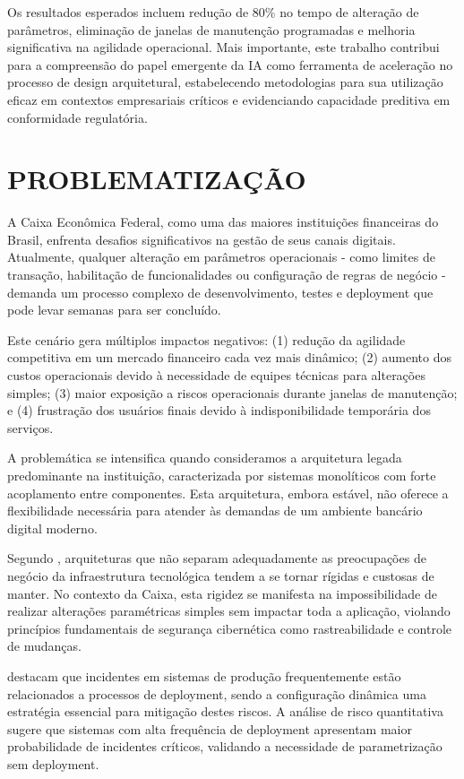 Os resultados esperados incluem redução de 80\% no tempo de alteração de parâmetros, eliminação de janelas de manutenção programadas e melhoria significativa na agilidade operacional. Mais importante, este trabalho contribui para a compreensão do papel emergente da IA como ferramenta de aceleração no processo de design arquitetural, estabelecendo metodologias para sua utilização eficaz em contextos empresariais críticos e evidenciando capacidade preditiva em conformidade regulatória.

\chapter{PROBLEMATIZAÇÃO}

A Caixa Econômica Federal, como uma das maiores instituições financeiras do Brasil, enfrenta desafios significativos na gestão de seus canais digitais. Atualmente, qualquer alteração em parâmetros operacionais - como limites de transação, habilitação de funcionalidades ou configuração de regras de negócio - demanda um processo complexo de desenvolvimento, testes e deployment que pode levar semanas para ser concluído.

Este cenário gera múltiplos impactos negativos: (1) redução da agilidade competitiva em um mercado financeiro cada vez mais dinâmico; (2) aumento dos custos operacionais devido à necessidade de equipes técnicas para alterações simples; (3) maior exposição a riscos operacionais durante janelas de manutenção; e (4) frustração dos usuários finais devido à indisponibilidade temporária dos serviços.

A problemática se intensifica quando consideramos a arquitetura legada predominante na instituição, caracterizada por sistemas monolíticos com forte acoplamento entre componentes. Esta arquitetura, embora estável, não oferece a flexibilidade necessária para atender às demandas de um ambiente bancário digital moderno.

Segundo , arquiteturas que não separam adequadamente as preocupações de negócio da infraestrutura tecnológica tendem a se tornar rígidas e custosas de manter. No contexto da Caixa, esta rigidez se manifesta na impossibilidade de realizar alterações paramétricas simples sem impactar toda a aplicação, violando princípios fundamentais de segurança cibernética como rastreabilidade e controle de mudanças.

 destacam que incidentes em sistemas de produção frequentemente estão relacionados a processos de deployment, sendo a configuração dinâmica uma estratégia essencial para mitigação destes riscos. A análise de risco quantitativa sugere que sistemas com alta frequência de deployment apresentam maior probabilidade de incidentes críticos, validando a necessidade de parametrização sem deployment.

